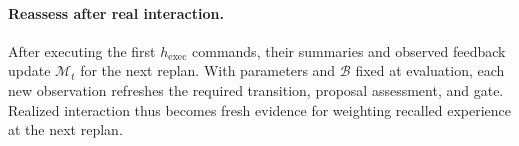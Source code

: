 \paragraph{Reassess after real interaction.}
After executing the first $h_{\mathrm{exec}}$ commands, their summaries and observed feedback update $\mathcal M_t$ for the next replan.
With parameters and $\mathcal B$ fixed at evaluation, each new observation refreshes the required transition, proposal assessment, and gate.
Realized interaction thus becomes fresh evidence for weighting recalled experience at the next replan.
